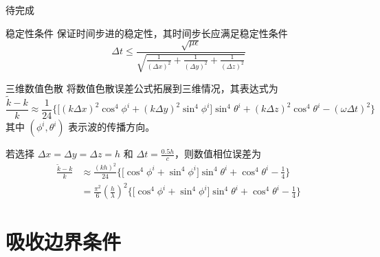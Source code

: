 \begin{theorem}
    待完成
\end{theorem}

\begin{theorem}{稳定性条件}
    保证时间步进的稳定性，其时间步长应满足稳定性条件
    \begin{equation}
        \Delta t \leq \frac{\sqrt{\mu \epsilon}}
        {\sqrt{\frac{1}{(\Delta x)^2}+\frac{1}{(\Delta y)^2}+\frac{1}{(\Delta z)^2}}}
    \end{equation}
\end{theorem}

\begin{theorem}{三维数值色散}
    将数值色散误差公式拓展到三维情况，其表达式为
    \begin{equation}
        \frac{\tilde{k}-k}{k}
        \approx\frac{1}{24}
        \Bigg\{
            \Big[
                (k\Delta x)^2\cos^4\phi^i
                +(k\Delta y)^2\sin^4\phi^i
            \Big]\sin^4\theta^i
            +(k\Delta z)^2\cos^4\theta^i
            -(\omega \Delta t)^2
        \Bigg\}
    \end{equation}
    其中 $(\phi^i,\theta^i)$ 表示波的传播方向。
\end{theorem}

\begin{example}
    若选择 $\Delta x=\Delta y=\Delta z = h$ 和 $\Delta t = \frac{0.5h}{c}$，则数值相位误差为
    \begin{equation*}
        \begin{aligned}
            \frac{\tilde{k}-k}{k}
            &\approx\frac{(kh)^2}{24}
            \Bigg\{
                \Big[
                    \cos^4\phi^i
                    +\sin^4\phi^i
                \Big]\sin^4\theta^i
                +\cos^4\theta^i
                -\frac{1}{4}
            \Bigg\}\\
            &=\frac{\pi^2}{6}\left(\frac{h}{\lambda}\right)^2
            \Bigg\{
                \Big[
                    \cos^4\phi^i
                    +\sin^4\phi^i
                \Big]\sin^4\theta^i
                +\cos^4\theta^i
                -\frac{1}{4}
            \Bigg\}
        \end{aligned}
    \end{equation*}
\end{example}

\section{吸收边界条件}

